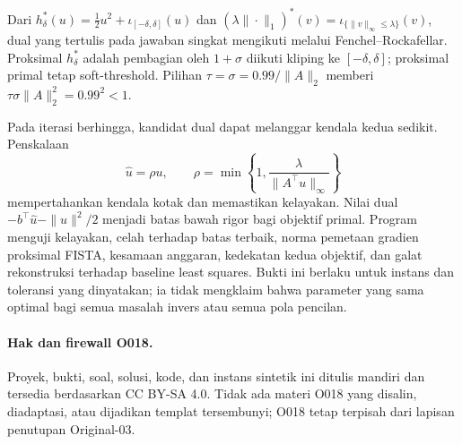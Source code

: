 Dari
$h_\delta^*(u)=\frac12u^2+\iota_{[-\delta,\delta]}(u)$ dan
$(\lambda\|\cdot\|_1)^*(v)=\iota_{\{\|v\|_\infty\leq\lambda\}}(v)$,
dual yang tertulis pada jawaban singkat mengikuti melalui Fenchel--Rockafellar.
Proksimal $h_\delta^*$ adalah pembagian oleh $1+\sigma$ diikuti kliping ke
$[-\delta,\delta]$; proksimal primal tetap soft-threshold. Pilihan
$\tau=\sigma=0.99/\|A\|_2$ memberi
$\tau\sigma\|A\|_2^2=0.99^2<1$.

Pada iterasi berhingga, kandidat dual dapat melanggar kendala kedua sedikit.
Penskalaan
\[
 \widehat u=\rho u,
 \qquad
 \rho=\min\left\{1,
 \frac{\lambda}{\|A^\top u\|_\infty}\right\}
\]
mempertahankan kendala kotak dan memastikan kelayakan. Nilai dual
$-b^\top\widehat u-\|\widehat u\|^2/2$ menjadi batas bawah rigor bagi
objektif primal. Program menguji kelayakan, celah terhadap batas terbaik,
norma pemetaan gradien proksimal FISTA, kesamaan anggaran, kedekatan kedua
objektif, dan galat rekonstruksi terhadap baseline least squares. Bukti ini
berlaku untuk instans dan toleransi yang dinyatakan; ia tidak mengklaim bahwa
parameter yang sama optimal bagi semua masalah invers atau semua pola
pencilan.

\paragraph{Hak dan firewall O018.}
Proyek, bukti, soal, solusi, kode, dan instans sintetik ini ditulis mandiri dan
tersedia berdasarkan CC BY-SA 4.0. Tidak ada materi O018 yang disalin,
diadaptasi, atau dijadikan templat tersembunyi; O018 tetap terpisah dari
lapisan penutupan Original-03.
